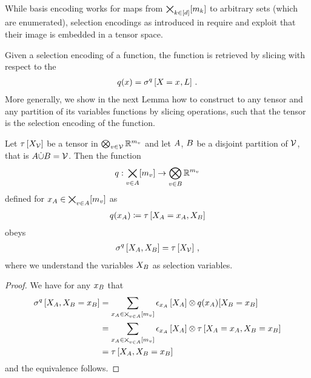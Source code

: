 While basis encoding works for maps from $\bigtimes_{k\in[d]}[m_{k}]$ to arbitrary sets (which are enumerated), selection encodings as introduced in  require and exploit that their image is embedded in a tensor space.

Given a selection encoding of a function, the function is retrieved by slicing with respect to the
\begin{align*}
    q(x) = \sigma^{q}\left[X_{}=x_{},L\right] \, .
\end{align*}
More generally, we show in the next Lemma how to construct to any tensor and any partition of its variables functions by slicing operations, such that the tensor is the selection encoding of the function.

\begin{theorem}
    \label{the:inverseSelectionEncoding} %
    Let $\tau\left[X_{\mathcal{V}}\right]$ be a tensor in $\bigotimes_{v\in\mathcal{V}}\mathbb{R}^{m_{v}}$ and let $A$, $B$ be a disjoint partition of $\mathcal{V}$, that is $A\dot{\cup}B=\mathcal{V}$.
    Then the function
    \begin{align*}
        q : \bigtimes_{v\in A}[m_{v}] \rightarrow \bigotimes_{v\in B} \mathbb{R}^{m_{v}}
    \end{align*}
    defined for $x_{A}\in\bigtimes_{v\in A}[m_{v}]$ as
    \begin{align*}
        q(x_{A}) \coloneqq \tau\left[X_{A}=x_{A},X_{B}\right]
    \end{align*}
    obeys
    \begin{align*}
        \sigma^{q}\left[X_{A},X_{B}\right] = \tau\left[X_{\mathcal{V}}\right] \, ,
    \end{align*}
    where we understand the variables $X_{B}$ as selection variables.
\end{theorem}
\begin{proof}
    We have for any $x_{B}$ that
    \begin{align*}
        \sigma^{q}\left[X_{A},X_{B}=x_{B}\right]
        &= \sum_{x_{A}\in\bigtimes_{v\in A}[m_{v}]} \epsilon_{x_{A}}\left[X_{A}\right]
        \otimes q(x_{A})[X_{B}=x_{B}] \\
        &= \sum_{x_{A}\in\bigtimes_{v\in A}[m_{v}]} \epsilon_{x_{A}}\left[X_{A}\right]
        \otimes \tau\left[X_{A}=x_{A},X_{B}=x_{B}\right] \\
        &= \tau\left[X_{A},X_{B}=x_{B}\right]
    \end{align*}
    and the equivalence follows.
\end{proof}


